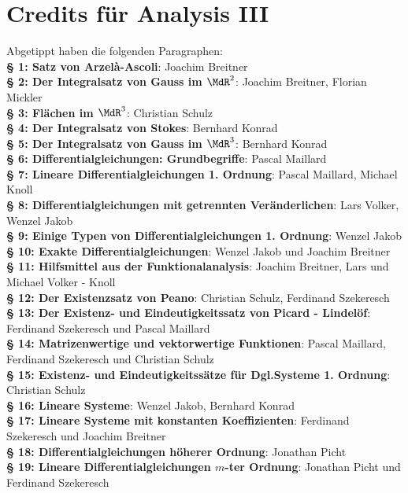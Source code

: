 \chapter{Credits für Analysis III} Abgetippt haben die folgenden Paragraphen:\\%
\textbf{§ 1: Satz von Arzelà-Ascoli}: Joachim Breitner\\
\textbf{§ 2: Der Integralsatz von Gauss im $\MdR^2$}: Joachim Breitner, Florian Mickler\\
\textbf{§ 3: Flächen im $\MdR^3$}: Christian Schulz\\
\textbf{§ 4: Der Integralsatz von Stokes}: Bernhard Konrad\\
\textbf{§ 5: Der Integralsatz von Gauss im $\MdR^3$}: Bernhard Konrad\\
\textbf{§ 6: Differentialgleichungen: Grundbegriffe}: Pascal Maillard\\
\textbf{§ 7: Lineare Differentialgleichungen 1. Ordnung}: Pascal Maillard, Michael Knoll\\
\textbf{§ 8: Differentialgleichungen mit getrennten Veränderlichen}: Lars Volker, Wenzel Jakob\\
\textbf{§ 9: Einige Typen von Differentialgleichungen 1. Ordnung}: Wenzel Jakob\\
\textbf{§ 10: Exakte Differentialgleichungen}: Wenzel Jakob und Joachim Breitner\\
\textbf{§ 11: Hilfsmittel aus der Funktionalanalysis}: Joachim Breitner, Lars und Michael Volker - Knoll\\
\textbf{§ 12: Der Existenzsatz von Peano}: Christian Schulz, Ferdinand Szekeresch\\
\textbf{§ 13: Der Existenz- und Eindeutigkeitssatz von Picard - Lindelöf}: Ferdinand Szekeresch und Pascal Maillard\\
\textbf{§ 14: Matrizenwertige und vektorwertige Funktionen}: Pascal Maillard, Ferdinand Szekeresch und Christian Schulz\\
\textbf{§ 15: Existenz- und Eindeutigkeitssätze für Dgl.Systeme 1. Ordnung}: Christian Schulz\\
\textbf{§ 16: Lineare Systeme}: Wenzel Jakob, Bernhard Konrad\\
\textbf{§ 17: Lineare Systeme mit konstanten Koeffizienten}: Ferdinand Szekeresch und Joachim Breitner\\
\textbf{§ 18: Differentialgleichungen höherer Ordnung}: Jonathan Picht\\
\textbf{§ 19: Lineare Differentialgleichungen $m$-ter Ordnung}: Jonathan Picht und Ferdinand Szekeresch\\
